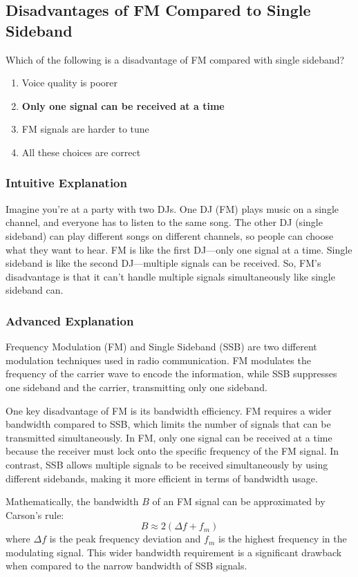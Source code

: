 \subsection{Disadvantages of FM Compared to Single Sideband}
\label{T8A12}

\begin{tcolorbox}[colback=gray!10!white,colframe=black!75!black,title=T8A12]
Which of the following is a disadvantage of FM compared with single sideband?
\begin{enumerate}[label=\Alph*)]
    \item Voice quality is poorer
    \item \textbf{Only one signal can be received at a time}
    \item FM signals are harder to tune
    \item All these choices are correct
\end{enumerate}
\end{tcolorbox}

\subsubsection{Intuitive Explanation}
Imagine you're at a party with two DJs. One DJ (FM) plays music on a single channel, and everyone has to listen to the same song. The other DJ (single sideband) can play different songs on different channels, so people can choose what they want to hear. FM is like the first DJ—only one signal at a time. Single sideband is like the second DJ—multiple signals can be received. So, FM's disadvantage is that it can't handle multiple signals simultaneously like single sideband can.

\subsubsection{Advanced Explanation}
Frequency Modulation (FM) and Single Sideband (SSB) are two different modulation techniques used in radio communication. FM modulates the frequency of the carrier wave to encode the information, while SSB suppresses one sideband and the carrier, transmitting only one sideband. 

One key disadvantage of FM is its bandwidth efficiency. FM requires a wider bandwidth compared to SSB, which limits the number of signals that can be transmitted simultaneously. In FM, only one signal can be received at a time because the receiver must lock onto the specific frequency of the FM signal. In contrast, SSB allows multiple signals to be received simultaneously by using different sidebands, making it more efficient in terms of bandwidth usage.

Mathematically, the bandwidth \( B \) of an FM signal can be approximated by Carson's rule:
\[
B \approx 2(\Delta f + f_m)
\]
where \( \Delta f \) is the peak frequency deviation and \( f_m \) is the highest frequency in the modulating signal. This wider bandwidth requirement is a significant drawback when compared to the narrow bandwidth of SSB signals.

